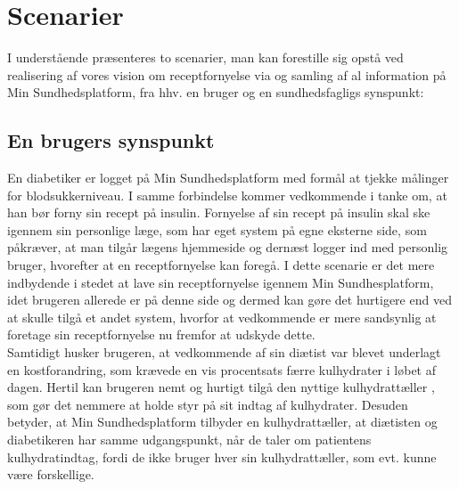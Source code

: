 \section{Scenarier}
I understående præsenteres to scenarier, man kan forestille sig opstå ved realisering af vores vision om receptfornyelse via og samling af al information 
 på Min Sundhedsplatform, fra hhv. en bruger og en sundhedsfagligs synspunkt:

\subsection{En brugers synspunkt}
En diabetiker er logget på Min Sundhedsplatform med formål at tjekke målinger for blodsukkerniveau. I samme forbindelse kommer vedkommende i tanke om, at han bør forny sin recept på insulin. Fornyelse af sin recept på insulin skal ske igennem sin personlige læge, som har eget system på egne eksterne side, som påkræver, at man tilgår lægens hjemmeside og dernæst logger ind med personlig bruger, hvorefter at en receptfornyelse kan foregå. I dette scenarie er det mere indbydende i stedet at lave sin receptfornyelse igennem Min Sundhesplatform, idet brugeren allerede er på denne side og dermed kan gøre det hurtigere end ved at skulle tilgå et andet system, hvorfor at vedkommende er mere sandsynlig at foretage sin receptfornyelse nu fremfor at udskyde dette.\\
Samtidigt husker brugeren, at vedkommende af sin diætist var blevet underlagt en kostforandring, som krævede en vis procentsats færre kulhydrater i løbet af dagen. Hertil kan brugeren nemt og hurtigt tilgå den nyttige  kulhydrattæller ,
som gør det nemmere at holde styr på sit indtag af kulhydrater. Desuden betyder, at Min Sundhedsplatform tilbyder en kulhydrattæller, at diætisten og diabetikeren har samme udgangspunkt, når de taler om patientens kulhydratindtag, fordi de ikke bruger hver sin kulhydrattæller, som evt. kunne være forskellige. 


